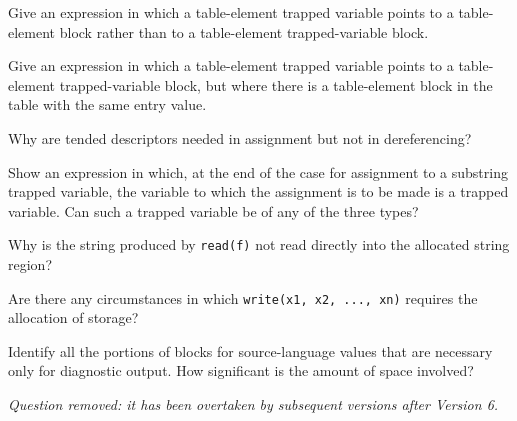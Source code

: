  Give an expression in which a table-element
trapped variable points to a table-element block rather than to a
table-element trapped-variable block.

 Give an expression in which a table-element
trapped variable points to a table-element trapped-variable block, but
where there is a table-element block in the table with the same entry
value.

Why are tended descriptors needed in assignment but not in dereferencing?

 Show an expression in which, at the end of the case for
assignment to a substring trapped variable, the variable to which the
assignment is to be made is a trapped variable. Can such a trapped
variable be of any of the three types?

 Why is the string produced by \texttt{read(f)}
not read directly into the allocated string region?

 Are there any circumstances in which
\texttt{write(x1, x2, ..., xn)} requires the allocation of storage?

 Identify all the portions of blocks for
source-language values that are necessary only for diagnostic
output. How significant is the amount of space involved?

{\em Question removed: it has been overtaken by subsequent versions after Version 6.}

